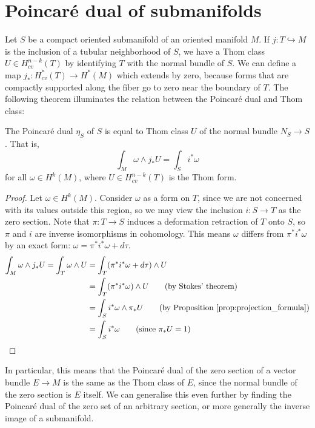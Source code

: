 \section{Poincar\'e dual of submanifolds}
Let $S$ be a compact oriented submanifold of an oriented manifold $M$. 
If $j:T \hookrightarrow M$ is the inclusion of a tubular neighborhood of $S$, 
we have a Thom class $U \in H^{n-k}_{cv}(T)$ by identifying $T$ with the normal
bundle of $S$. 
We can define a map $j_*:H_{cv}^{*}(T) \to H^*(M)$ which extends by zero,
because forms that are compactly supported along the fiber go to zero near 
the boundary of $T$. 
The following theorem illuminates the relation between the Poincar\'e dual and Thom class:

\begin{thm} \label{thm:poincare_thom} %
	The Poincar\'e dual $\eta_S$ of $S$ is equal to Thom class $U$ of the
	normal bundle $N_S \to S$. That is, 
	\[
		\int_M \omega\wedge j_*U = \int_S i^*\omega 
	\] 
	for all $\omega\in H^k(M)$, where $U\in H^{n-k}_{cv}(T)$ is the Thom form.
\end{thm}
\begin{proof}
	Let $\omega \in H^k(M)$. Consider $\omega$ as a form on  $T$, since
	we are not concerned with its values outside this region, so we may view
	the inclusion $i : S \to T$ as the zero section. Note that $\pi : T \to S$
	induces a deformation retraction of $T$ onto $S$, so $\pi$ and  $i$
	are inverse isomorphisms in cohomology. This means $\omega$ differs from
	$\pi^*i^*\omega$ by an exact form:  $\omega = \pi^*i^*\omega + d\tau$.
	\begin{align*}
		\int_M \omega\wedge j_*U 
		= \int_T \omega \wedge U 
		&= \int_T (\pi^*i^*\omega + d\tau) \wedge U \\
		&= \int_T (\pi^*i^*\omega) \wedge U \tag{by Stokes' theorem}\\
		&= \int_S i^*\omega  \wedge \pi_*U 
		\tag{by Proposition \ref{prop:projection_formula}}\\
		&= \int_S i^*\omega \tag{since $\pi_*U = 1$} 
	\end{align*}
\end{proof}
\vspace{-1.5ex}
In particular, this means that the Poincar\'e dual of the zero section of a
vector bundle $E\to M$ is the same as the Thom class of  $E$, since the normal
bundle of the zero section is  $E$ itself. We can generalise this even further
by finding the Poincar\'e dual of the zero set of an arbitrary section, or more
generally the inverse image of a submanifold.

